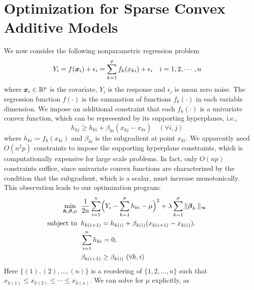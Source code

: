 \section{Optimization for Sparse Convex Additive Models}

We now consider the following nonparametric regression problem
\begin{equation}\nonumber
          Y_{i} = f(\boldsymbol{x}_{i}) + \epsilon_{i} = 
                  \sum_{k=1}^{p}f_{k}(x_{ki}) + \epsilon_{i} \quad i=1,2,\cdots,n
\end{equation}
where $\boldsymbol{x}_{i}\in\mathbb{R}^{p}$ is the covariate, $Y_{i}$ is the
response and $\epsilon_{i}$ is mean zero noise. The regression function $f(\cdot)$ is the summation of 
functions $f_{k}(\cdot)$ in each variable dimension.  
We impose an additional constraint that each $f_{k}(\cdot)$ is 
a univariate convex function, which can be represented by its supporting hyperplanes, i.e.,
\begin{equation}\label{hyper}
      h_{kj} \geq h_{ki} + \beta_{ki}(x_{kj}-x_{ki}) \quad (\forall i,j)
\end{equation}
where $h_{ki}\coloneqq f_{k}(x_{ki})$ and $\beta_{ki}$ is the
subgradient at point $x_{ki}$. We apparently need $O(n^2 p)$ constraints to
impose the supporting hyperplane constraints, which is computationally
expensive for large scale problems.  In fact, only $O(np)$
constraints suffice, since univariate convex functions are
characterized by the condition that the subgradient, which is a scalar, must
increase monotonically. This observation leads to our optimization
program:
\begin{equation}
\begin{split}
       \min_{\bds{h},\bds{\beta},\mu} & \;\; \frac{1}{2n}\sum_{i=1}^{n}
                     \Bigl( Y_{i}-\sum_{k=1}^{p}h_{ki} - \mu \Bigr)^{2} 
                         + \lambda\sum_{k=1}^{p}\|\bds{\beta}_{k\cdot}\|_{\infty} \\
       \textrm{subject to} &\;\; h_{k(i+1)} = h_{k(i)} + \beta_{k(i)}(x_{k(i+1)}-x_{k(i)}), \\
                     & \;\; \sum_{i=1}^{n}h_{ki}=0,\\
                     & \;\; \beta_{k(i+1)} \geq \beta_{k(i)} \ (\forall k, i)
\end{split}
\label{np}
\end{equation}
Here $\{(1),(2),\ldots,(n)\}$ is a reordering of $\{1,2,\ldots,n\}$ such that $x_{k(1)}\leq{}x_{k(2)}\leq\cdots\leq{}x_{k(n)}$. We can solve for $\mu$ explicitly, as  
